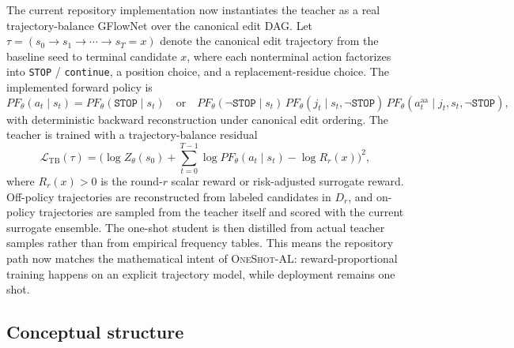 \documentclass[11pt]{article}
\newcommand{\PF}{\ensuremath{PF}}
\newcommand{\methodIII}{\textsc{OneShot-AL}}
\begin{document}
	The current repository implementation now instantiates the teacher as a real trajectory-balance GFlowNet over the canonical edit DAG. Let $\tau=(s_0\rightarrow s_1\rightarrow\cdots\rightarrow s_T=x)$ denote the canonical edit trajectory from the baseline seed to terminal candidate $x$, where each nonterminal action factorizes into \texttt{STOP} / \texttt{continue}, a position choice, and a replacement-residue choice. The implemented forward policy is
	\begin{equation}
		\PF_\theta(a_t\mid s_t)=
		\PF_\theta(\mathtt{STOP}\mid s_t)
		\quad\text{or}\quad
		\PF_\theta(\neg\mathtt{STOP}\mid s_t)\,
		\PF_\theta(j_t\mid s_t,\neg\mathtt{STOP})\,
		\PF_\theta(a_t^{\mathrm{aa}}\mid j_t,s_t,\neg\mathtt{STOP}),
	\end{equation}
	with deterministic backward reconstruction under canonical edit ordering. The teacher is trained with a trajectory-balance residual
	\begin{equation}
		\mathcal{L}_{\mathrm{TB}}(\tau)
		=
		\Bigg(
		\log Z_\theta(s_0)
		+ \sum_{t=0}^{T-1}\log \PF_\theta(a_t\mid s_t)
		- \log R_r(x)
		\Bigg)^2,
	\end{equation}
	where $R_r(x)>0$ is the round-$r$ scalar reward or risk-adjusted surrogate reward. Off-policy trajectories are reconstructed from labeled candidates in $D_r$, and on-policy trajectories are sampled from the teacher itself and scored with the current surrogate ensemble. The one-shot student is then distilled from actual teacher samples rather than from empirical frequency tables. This means the repository path now matches the mathematical intent of \methodIII{}: reward-proportional training happens on an explicit trajectory model, while deployment remains one shot.
	
	\subsection{Conceptual structure}
	
\end{document}
